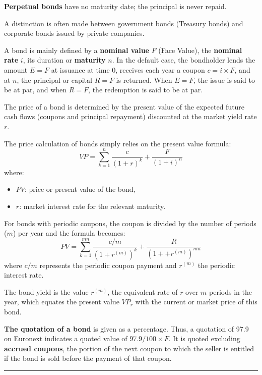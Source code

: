 \begin{f}
\textbf{Perpetual bonds} have no maturity date; the principal is never repaid.
 
A distinction is often made between government bonds (Treasury bonds) and
 corporate bonds issued by private companies.



A bond is mainly defined by a \textbf{nominal value} $F$ (Face Value), the \textbf{nominal rate} $i$, its duration or \textbf{maturity} $n$.
In the default case, the bondholder lends the amount $E=F$ at issuance at time 0, receives each year a coupon $c = i \times F$, and at $n$, the principal or capital $R=F$ is returned.
When $E=F$, the issue is said to be at par, and when $R=F$, the redemption is said to be at par.


The price of a bond is determined by the present value of the expected future cash flows (coupons and principal repayment) discounted at the market yield rate $r$.
 
The price calculation of bonds simply relies on the present value formula:
\[
VP = \sum_{k=1}^{n} \frac{c}{(1 + r)^k} + \frac{F}{(1 + i)^n}
 \]
where:
\begin{itemize}
    \item $PV$: price or present value of the bond,
	\item $r$: market interest rate for the relevant maturity.
\end{itemize}


For bonds with periodic coupons, the coupon is divided by the number of periods ($m$) per year and the formula becomes:
\[ 
PV = \sum_{k=1}^{mn} \frac{c/m}{(1 + r^{(m)})^k} + \frac{R}{(1 + + r^{(m)})^{mn}}
 \]
where $c/m$ represents the periodic coupon payment and $r^{(m)}$ the periodic interest rate.

The bond yield is the value $r^{(m)}$, the equivalent rate of $r$ over $m$ periods in the year, which equates the present value $VP_r$ with the current or market price of this bond.

\textbf{The quotation of a bond} is given as a percentage. Thus, a quotation of 97.9 on Euronext indicates a quoted value of $97.9 / 100 \times F$.  
It is quoted excluding \textbf{accrued coupons}, the portion of the next coupon to which the seller is entitled if the bond is sold before the payment of that coupon.
\end{f}
\hrule

